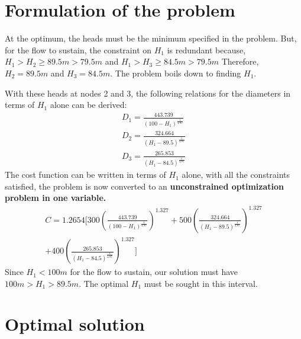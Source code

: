 \documentclass[10pt,a4paper]{article}
\begin{document}
\section{ Formulation of the problem }

At the optimum, the heads must be the minimum specified in the problem. But, for the flow to sustain,  the constraint on $H_1$ is redundant because,
\newline  $H_1>H_2\geqslant 89.5m>79.5m$ and
 \newline  $H_1>H_3\geqslant 84.5m>79.5m$
 \newline Therefore, $H_2 = 89.5m$ and $H_3 = 84.5m$. The problem boils down to finding $H_1$.

 With these heads at nodes 2 and 3, the following relations for the diameters in terms of $H_1$ alone can be derived:
 \begin{equation}
   \begin{split} 
    D_1 = \frac{443.739}{{(100-H_1)}^\frac{1}{4.87}} \\   D_2 = \frac{324.664}{{(H_1-89.5)}^\frac{1}{4.87}}  \\   D_3= \frac{265.853}{{(H_1-84.5)}^\frac{1}{4.87}} 
   \end{split} 
 \end{equation}
The cost function can be written in terms of $H_1 $ alone, with all the constraints satisfied, the problem is now converted to an \textbf{ unconstrained optimization problem in one variable.} \newline
 \begin{equation}
   \begin{split} 
   C = 1.2654 [300( \frac{443.739}{{(100-H_1)}^\frac{1}{4.87}})^{1.327} +500(\frac{324.664}{{(H_1-89.5)}^\frac{1}{4.87}})^{1.327}  \\ +400( \frac{265.853}{{(H_1-84.5)}^\frac{1}{4.87}})^{1.327}]
   \end{split} 
 \end{equation}
 Since $H_1<100m$ for the flow to sustain, our solution must have $100m>H_1>89.5m$. The optimal $H_1$  must be sought in this interval.
 
 \section{Optimal solution}
 
\end{document}
